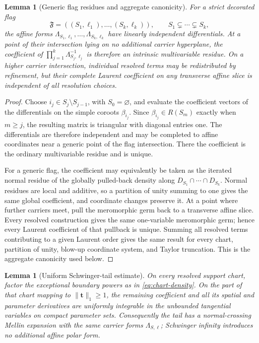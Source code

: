 \documentclass[11pt]{article}
\newtheorem{lemma}[theorem]{Lemma}
\begin{document}
\begin{lemma}[Generic flag residues and aggregate canonicity]
\label{lem:flag-canonicity}
For a strict decorated flag
\[
 \mathfrak F=((S_1,\ell_1),\ldots,(S_k,\ell_k)),
 \qquad S_1\subsetneq\cdots\subsetneq S_k,
\]
the affine forms
\(\Lambda_{S_1,\ell_1},\ldots,\Lambda_{S_k,\ell_k}\) have
linearly independent differentials.  At a point of their intersection
lying on no additional carrier hyperplane, the coefficient of
\(\prod_{j=1}^k\Lambda_{S_j,\ell_j}^{-1}\) is therefore an intrinsic
multivariable residue.  On a higher carrier intersection, individual
resolved terms may be redistributed by refinement, but their complete
Laurent coefficient on any transverse affine slice is independent of
all resolution choices.
\end{lemma}

\begin{proof}
Choose \(i_j\in S_j\setminus S_{j-1}\), with \(S_0=\varnothing\),
and evaluate the coefficient vectors of the differentials on the
simple coroots \(\beta_{i_j}\).  Since
\(\beta_{i_j}\in R(S_m)\) exactly when \(m\geq j\), the resulting
matrix is triangular with diagonal entries one.  The differentials are
therefore independent and may be completed to affine coordinates near
a generic point of the flag intersection.  There the coefficient is
the ordinary multivariable residue and is unique.

For a generic flag, the coefficient may equivalently be taken as the
iterated normal residue of the globally pulled-back density along
\(D_{S_1}\cap\cdots\cap D_{S_k}\).  Normal residues are local and
additive, so a partition of unity summing to one gives the same global
coefficient, and coordinate changes preserve it.  At a point where
further carriers meet, pull the meromorphic germ back to a transverse
affine slice.  Every resolved construction gives the same one-variable
meromorphic germ; hence every Laurent coefficient of that pullback is
unique.  Summing all resolved terms contributing to a given Laurent
order gives the same result for every chart, partition of unity,
blow-up coordinate system, and Taylor truncation.  This is the aggregate
canonicity used below.
\end{proof}

\begin{lemma}[Uniform Schwinger-tail estimate]
\label{lem:schwinger-tail}
On every resolved support chart, factor the exceptional boundary powers
as in \eqref{eq:chart-density}.  On the part of that chart mapping to
\(\lVert\mathbf t\rVert_1\ge1\), the remaining coefficient and all its
spatial and parameter derivatives are uniformly integrable in the
unbounded tangential variables on compact parameter sets.  Consequently
the tail has a normal-crossing Mellin expansion with the same carrier
forms \(\Lambda_{S,\ell}\); Schwinger infinity introduces no additional
affine polar form.
\end{lemma}
\end{document}
